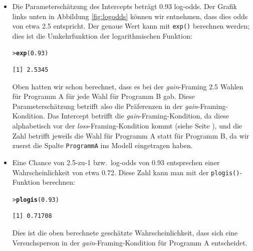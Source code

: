 \documentclass[oneside, 10pt]{book}\usepackage[]{graphicx}\usepackage[]{xcolor}
\makeatletter
\newcommand{\hlnum}[1]{\textcolor[rgb]{0.686,0.059,0.569}{#1}}%
\newcommand{\hlstd}[1]{\textcolor[rgb]{0.345,0.345,0.345}{#1}}%
\newcommand{\hlkwd}[1]{\textcolor[rgb]{0.737,0.353,0.396}{\textbf{#1}}}%
\newenvironment{kframe}{%
 \def\at@end@of@kframe{}%
 \ifinner\ifhmode%
  \def\at@end@of@kframe{\end{minipage}}%
  \begin{minipage}{\columnwidth}%
 \fi\fi%
 \def\FrameCommand##1{\hskip\@totalleftmargin \hskip-\fboxsep
 \colorbox{shadecolor}{##1}\hskip-\fboxsep
     \hskip-\linewidth \hskip-\@totalleftmargin \hskip\columnwidth}%
 \MakeFramed {\advance\hsize-\width
   \@totalleftmargin\z@ \linewidth\hsize
   \@setminipage}}%
 {\par\unskip\endMakeFramed%
 \at@end@of@kframe}
\newenvironment{knitrout}{}{} %
\makeatother
\begin{document}
\begin{itemize}
 \item Die Parameterschätzung des Intercepts beträgt 0.93
 log-odds. Der Grafik links unten in Abbildung \ref{fig:logodds}
 können wir entnehmen, dass dies odds von etwa 2.5 entspricht.
 Der genaue Wert kann mit \texttt{exp()} berechnen werden;
 dies ist die Umkehrfunktion der logarithmischen Funktion:
\begin{knitrout}
\color{fgcolor}\begin{kframe}
\begin{alltt}
\hlstd{> }\hlkwd{exp}\hlstd{(}\hlnum{0.93}\hlstd{)}
\end{alltt}
\begin{verbatim}
[1] 2.5345
\end{verbatim}
\end{kframe}
\end{knitrout}

Oben hatten wir schon berechnet, dass
es bei der \textit{gain}-Framing 2.5 Wahlen
für Programm A für jede Wahl für Programm B gab.
Diese Parameterschätzung betrifft also die Präferenzen
in der \textit{gain}-Framing-Kondition.
Das Intercept betrifft die \textit{gain}-Framing-Kondition,
da diese alphabetisch vor der \textit{loss}-Framing-Kondition
kommt (siehe Seite \pageref{sec:alphabet}),
und die Zahl betrifft jeweils die Wahl für Programm A
statt für Programm B, da wir zuerst die Spalte
\texttt{ProgrammA} ins Modell eingetragen haben.

\item Eine Chance von 2.5-zu-1 bzw.\ log-odds von 0.93
entsprechen einer Wahrscheinlichkeit von etwa 0.72.
Diese Zahl kann man mit der \texttt{plogis()}-Funktion berechnen:
\begin{knitrout}
\color{fgcolor}\begin{kframe}
\begin{alltt}
\hlstd{> }\hlkwd{plogis}\hlstd{(}\hlnum{0.93}\hlstd{)}
\end{alltt}
\begin{verbatim}
[1] 0.71708
\end{verbatim}
\end{kframe}
\end{knitrout}

Dies ist die oben berechnete geschätzte Wahrscheinlichkeit,
dass sich eine Versuchsperson in der \textit{gain}-Framing-Kondition
für Programm A entscheidet.


\end{itemize}
\end{document}
